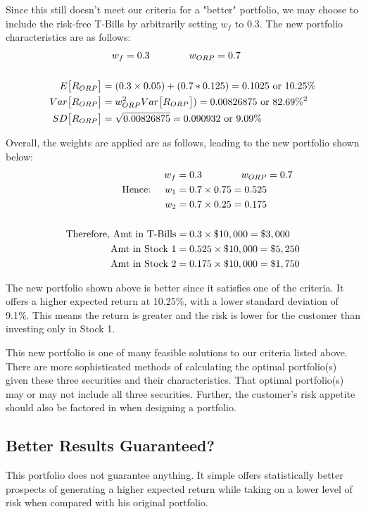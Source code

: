 \documentclass[12pt]{article}
\begin{document}
Since this still doesn't meet our criteria for a "better" portfolio, we may choose to include the risk-free T-Bills by arbitrarily setting $w_f$ to 0.3. The new portfolio characteristics are as follows:
\begin{align*}
	&\text{\quad} w_f = 0.3 \text{\qquad\qquad} w_{ORP} = 0.7\\
	&\\
	E\big[R_{ORP}\big] &= (0.3\times0.05) + (0.7*0.125) = 0.1025 \text{ or }10.25\%\\
	Var\big[R_{ORP}\big] &= w_{ORP}^2Var\big[R_{ORP}\big]) = 0.00826875 \text{ or } 82.69\%^2\\
	SD\big[R_{ORP}\big] &= \sqrt{0.00826875} = 0.090932 \text { or } 9.09\%\\
\end{align*}

Overall, the weights are applied are as follows, leading to the new portfolio shown below:
\begin{align*}
	w_f &= 0.3 \text{\qquad\qquad} w_{ORP} = 0.7\\
	\text{Hence: \quad} w_1 &= 0.7\times0.75 = 0.525\\
	w_2 &= 0.7\times0.25 = 0.175\\
	&\\
	\text{Therefore, Amt in T-Bills} &= 0.3 \times \$10,000 = \$3,000\\
	\text{Amt in Stock 1} &= 0.525 \times \$10,000 = \$5,250\\
	\text{Amt in Stock 2} &= 0.175 \times \$10,000 = \$1,750\\
\end{align*}

The new portfolio shown above is better since it satisfies one of the criteria. It offers a higher expected return at 10.25\%, with a lower standard deviation of 9.1\%. This means the return is greater and the risk is lower for the customer than investing only in Stock 1.

This new portfolio is one of many feasible solutions to our criteria listed above. There are more sophisticated methods of calculating the optimal portfolio(s) given these three securities and their characteristics. That optimal portfolio(s) may or may not include all three securities. Further, the customer's risk appetite should also be factored in when designing a portfolio.

\subsection{Better Results Guaranteed?}
This portfolio does not guarantee anything. It simple offers statistically better prospects of generating a higher expected return while taking on a lower level of risk when compared with his original portfolio. 
\end{document}
